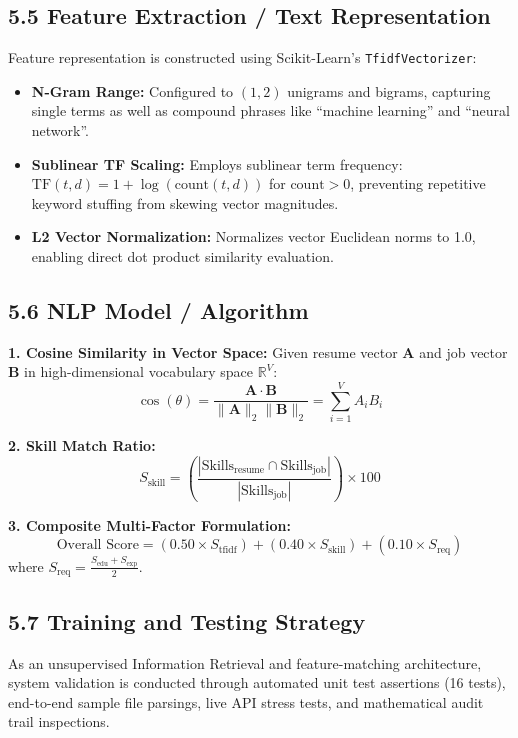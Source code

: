 \documentclass[11pt,a4paper]{article}
\begin{document}
\subsection{5.5 Feature Extraction / Text Representation}
Feature representation is constructed using Scikit-Learn's \texttt{TfidfVectorizer}:
\begin{itemize}[noitemsep]
    \item \textbf{N-Gram Range:} Configured to $(1, 2)$ unigrams and bigrams, capturing single terms as well as compound phrases like ``machine learning'' and ``neural network''.
    \item \textbf{Sublinear TF Scaling:} Employs sublinear term frequency: $\text{TF}(t, d) = 1 + \log(\text{count}(t, d))$ for $\text{count} > 0$, preventing repetitive keyword stuffing from skewing vector magnitudes.
    \item \textbf{L2 Vector Normalization:} Normalizes vector Euclidean norms to 1.0, enabling direct dot product similarity evaluation.
\end{itemize}

\subsection{5.6 NLP Model / Algorithm}
\textbf{1. Cosine Similarity in Vector Space:}
Given resume vector $\mathbf{A}$ and job vector $\mathbf{B}$ in high-dimensional vocabulary space $\mathbb{R}^V$:
\begin{equation}
\cos(\theta) = \frac{\mathbf{A} \cdot \mathbf{B}}{\|\mathbf{A}\|_2 \|\mathbf{B}\|_2} = \sum_{i=1}^{V} A_i B_i
\end{equation}

\textbf{2. Skill Match Ratio:}
\begin{equation}
S_{\text{skill}} = \left( \frac{|\text{Skills}_{\text{resume}} \cap \text{Skills}_{\text{job}}|}{|\text{Skills}_{\text{job}}|} \right) \times 100
\end{equation}

\textbf{3. Composite Multi-Factor Formulation:}
\begin{equation}
\text{Overall Score} = (0.50 \times S_{\text{tfidf}}) + (0.40 \times S_{\text{skill}}) + (0.10 \times S_{\text{req}})
\end{equation}
where $S_{\text{req}} = \frac{S_{\text{edu}} + S_{\text{exp}}}{2}$.

\subsection{5.7 Training and Testing Strategy}
As an unsupervised Information Retrieval and feature-matching architecture, system validation is conducted through automated unit test assertions (16 tests), end-to-end sample file parsings, live API stress tests, and mathematical audit trail inspections.
\end{document}
